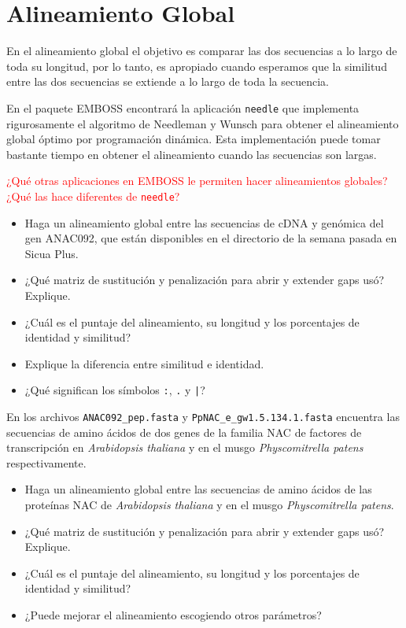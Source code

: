 \documentclass[letter,11pt]{book}
\begin{document}
\section{Alineamiento Global}

En el alineamiento global el objetivo es comparar las dos secuencias a lo largo de toda su longitud, por lo tanto, es apropiado cuando esperamos que la similitud entre las dos secuencias se extiende a lo largo de toda la secuencia.

En el paquete EMBOSS encontrará la aplicación \Verb+needle+ que implementa rigurosamente el algoritmo de  Needleman y Wunsch \citep{Needleman1970} para obtener el alineamiento global óptimo por programación dinámica. Esta implementación puede tomar bastante tiempo en obtener el alineamiento cuando las secuencias son largas.

\textcolor{red}{¿Qué otras aplicaciones en EMBOSS le permiten hacer alineamientos globales? ¿Qué las hace diferentes de \Verb+needle+?}

{\color{red}
\begin{itemize}
\item Haga un alineamiento global entre las secuencias de cDNA y genómica del gen ANAC092, que están disponibles en el directorio de la semana pasada en Sicua Plus.
\item ¿Qué matriz de sustitución y penalización para abrir y extender gaps usó? Explique.
\item ¿Cuál es el puntaje del alineamiento, su longitud y los porcentajes de identidad y similitud?
\item Explique la diferencia entre similitud e identidad.
\item ¿Qué significan los símbolos  \Verb+:+, \Verb+.+ y \Verb+|+?
\end{itemize}
}

En los archivos \Verb+ANAC092_pep.fasta+ y \Verb+PpNAC_e_gw1.5.134.1.fasta+ encuentra las secuencias de amino ácidos de dos genes de la familia NAC de factores de transcripción en \textit{Arabidopsis thaliana} y en el musgo \textit{Physcomitrella patens} respectivamente.

{\color{red}
\begin{itemize}
\item Haga un alineamiento global entre las secuencias de amino ácidos de las proteínas NAC de \textit{Arabidopsis thaliana} y en el musgo \textit{Physcomitrella patens}.
\item ¿Qué matriz de sustitución y penalización para abrir y extender gaps usó? Explique.
\item ¿Cuál es el puntaje del alineamiento, su longitud y los porcentajes de identidad y similitud?
\item ¿Puede mejorar el alineamiento escogiendo otros parámetros?
\end{itemize}
}
\end{document}
